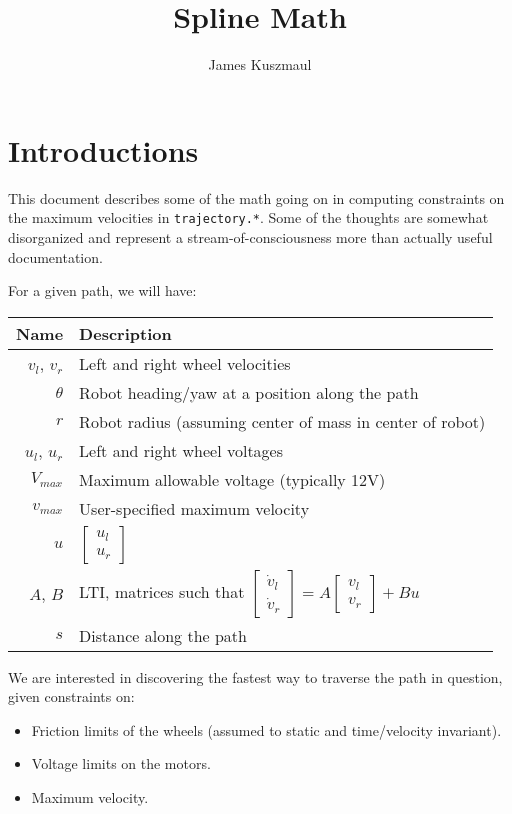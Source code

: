 \documentclass{article}
\title{Spline Math}
\author{James Kuszmaul}
\begin{document}
\maketitle

\section{Introductions}

This document describes some of the math going on in computing constraints on
the maximum velocities in \texttt{trajectory.*}. Some of the thoughts are
somewhat disorganized and represent a stream-of-consciousness more than actually
useful documentation.

For a given path, we will have:

\begin{tabular}{r|l}
Name & Description \\ \hline
$v_l$, $v_r$ & Left and right wheel velocities \\
$\theta$ & Robot heading/yaw at a position along the path \\
$r$ & Robot radius (assuming center of mass in center of robot) \\
$u_l$, $u_r$ & Left and right wheel voltages \\
$V_{max}$ & Maximum allowable voltage (typically 12V) \\
$v_{max}$ & User-specified maximum velocity \\
$u$ & $\begin{bmatrix} u_l \\ u_r \end{bmatrix}$ \\
$A$, $B$ & LTI, matrices such that $\begin{bmatrix} \dot{v}_l \\ \dot{v}_r
\end{bmatrix} = A \begin{bmatrix} v_l \\ v_r \end{bmatrix} + B u$ \\
$s$ & Distance along the path \\
\end{tabular}

We are interested in discovering the fastest way to traverse the path in
question, given constraints on:
\begin{itemize}
\item Friction limits of the wheels (assumed to static and time/velocity
      invariant).
\item Voltage limits on the motors.
\item Maximum velocity.
\end{itemize}
\end{document}
